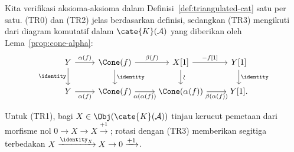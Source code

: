 \begin{bukti}
	Kita verifikasi aksioma-aksioma dalam
	Definisi~\ref{def:triangulated-cat} satu per satu. (TR0) dan (TR2) jelas
	berdasarkan definisi, sedangkan (TR3) mengikuti dari diagram komutatif dalam
	$\cate{K}(\mathcal{A})$ yang diberikan oleh
	Lema~\ref{prop:cone-alpha}:
	\[\begin{tikzcd}
		Y \arrow[r, "{\alpha(f)}"] \arrow[d, "\identity"'] & \Cone(f) \arrow[r, "{\beta(f)}"] \arrow[d, "\identity"] & X[1] \arrow[r, "{-f[1]}"] \arrow[d, "\sim" sloped] & Y[1] \arrow[d, "\identity"] \\
		Y \arrow[r, "{\alpha(f)}"'] & \Cone(f) \arrow[r, "{\alpha(\alpha(f))}"'] & \Cone(\alpha(f)) \arrow[r, "{\beta(\alpha(f))}"'] & Y[1] .
	\end{tikzcd}\]

	Untuk (TR1), bagi $X \in \Obj(\cate{K}(\mathcal{A}))$ tinjau kerucut
	pemetaan dari morfisme nol $0 \to X \to X \xrightarrow{+1}$; rotasi dengan
	(TR3) memberikan segitiga terbedakan
	$X \xrightarrow{\identity_X} X \to 0 \xrightarrow{+1}$.


\end{bukti}
